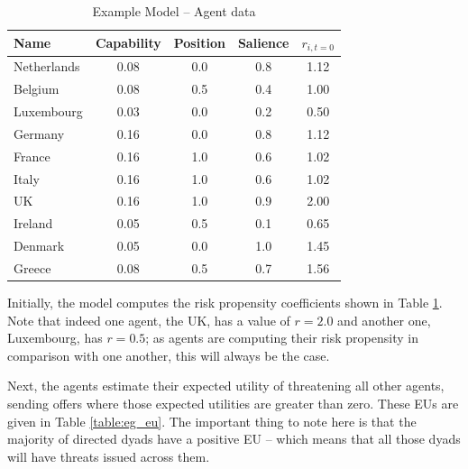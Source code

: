 \begin{table}
\centering
\caption{Example Model -- Agent data}
\label{table:eg_agent_data}
\begin{tabular}{lccc|c}
    \hline
    Name &  Capability &  Position &  Salience & $r_{i,t=0}$ \\
    \hline
    Netherlands &        0.08 &       0.0 &       0.8 & 1.12 \\
        Belgium &        0.08 &       0.5 &       0.4 & 1.00 \\
     Luxembourg &        0.03 &       0.0 &       0.2 & 0.50 \\
        Germany &        0.16 &       0.0 &       0.8 & 1.12 \\
         France &        0.16 &       1.0 &       0.6 & 1.02 \\
          Italy &        0.16 &       1.0 &       0.6 & 1.02 \\
             UK &        0.16 &       1.0 &       0.9 & 2.00 \\
        Ireland &        0.05 &       0.5 &       0.1 & 0.65 \\
        Denmark &        0.05 &       0.0 &       1.0 & 1.45 \\
         Greece &        0.08 &       0.5 &       0.7 & 1.56 \\
    \hline
\end{tabular}
\tableSpace
\end{table}

Initially, the model computes the risk propensity coefficients shown in Table \ref{table:eg_agent_data}. Note that indeed one agent, the UK, has a value of $r=2.0$ and another one, Luxembourg, has $r=0.5$; as agents are computing their risk propensity in comparison with one another, this will always be the case.

Next, the agents estimate their expected utility of threatening all other agents, sending offers where those expected utilities are greater than zero. These EUs are given in Table \ref{table:eg_eu}. The important thing to note here is that the majority of directed dyads have a positive EU -- which means that all those dyads will have threats issued across them. 

